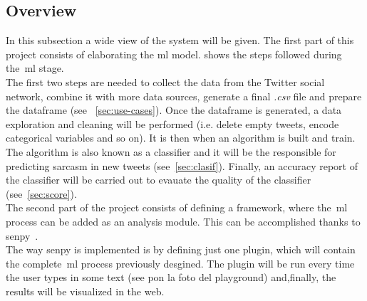 \subsection{Overview}
In this subsection a wide view of the system will be given. The first part of this project consists of elaborating the \ac{ml} model.
 shows the steps followed during the~\ac{ml} stage.\\
The first two steps are needed to collect the data from the Twitter social network, combine it with more data sources, generate a final \textit{.csv} file and prepare the dataframe (see ~\cref{sec:use-cases}). Once the dataframe is generated, a data exploration and cleaning will be performed (i.e. delete empty tweets, encode categorical variables and so on). It is then when an algorithm is built and train. The algorithm is also known as a classifier and it will be the responsible for predicting sarcasm in new tweets (see~\cref{sec:clasif}). Finally, an accuracy report of the classifier will be carried out to evauate the quality of the classifier (see~\cref{sec:score}).\\
The second part of the project consists of defining a framework, where the~\ac{ml} process can be added as an analysis module. This can be accomplished thanks to senpy~\cite{senpy}.\\
The way senpy is implemented is by defining just one plugin, which will contain the complete~\ac{ml} process previously desgined. The plugin will be run every time the user types in some text (see pon la foto del playground) and,finally, the results will be visualized in the web.

